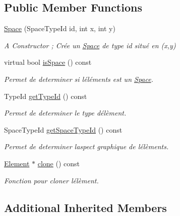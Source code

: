 \subsection*{Public Member Functions}
\begin{DoxyCompactItemize}
\item 
\hyperlink{classstate_1_1_space_a21cdd497cf2141748a05a30062ae2c4a}{Space} (Space\+Type\+Id id, int x, int y)
\begin{DoxyCompactList}\small\item\em A Constructor ; Crée un \hyperlink{classstate_1_1_space}{Space} de type id situé en (x,y) \end{DoxyCompactList}\item 
virtual bool \hyperlink{classstate_1_1_space_ae6a875b398ebe11adca364c5dc8a94a9}{is\+Space} () const
\begin{DoxyCompactList}\small\item\em Permet de determiner si l\textquotesingle{}éléments est un \hyperlink{classstate_1_1_space}{Space}. \end{DoxyCompactList}\item 
Type\+Id \hyperlink{classstate_1_1_space_a07fcfd9de95acfebb26e66f24f4ef519}{get\+Type\+Id} () const
\begin{DoxyCompactList}\small\item\em Permet de determiner le type d\textquotesingle{}élèment. \end{DoxyCompactList}\item 
Space\+Type\+Id \hyperlink{classstate_1_1_space_af05208d104c93dbffdb2643e2e2f54cf}{get\+Space\+Type\+Id} () const
\begin{DoxyCompactList}\small\item\em Permet de determiner l\textquotesingle{}aspect graphique de l\textquotesingle{}élèments. \end{DoxyCompactList}\item 
\hyperlink{classstate_1_1_element}{Element} $\ast$ \hyperlink{classstate_1_1_space_a2259b287265855ae2fee5050c4e4f97d}{clone} () const
\begin{DoxyCompactList}\small\item\em Fonction pour cloner l\textquotesingle{}élèment. \end{DoxyCompactList}\end{DoxyCompactItemize}
\subsection*{Additional Inherited Members}


